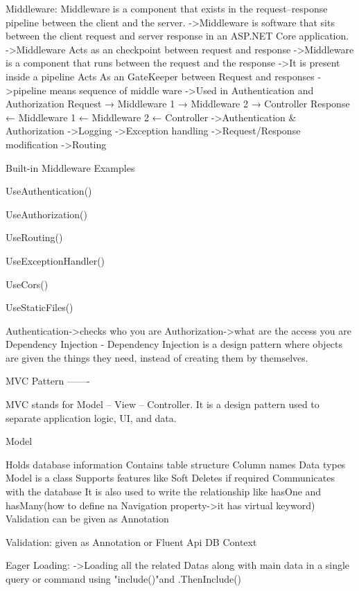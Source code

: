 Middleware:
        Middleware is a component that exists in the request–response pipeline between the client and the server.
          ->Middleware is software that sits between the client request and server response in an ASP.NET Core application.
          ->Middleware Acts as an checkpoint between request and response
            ->Middleware is a component that runs between the request and the response
            ->It is present inside a pipeline Acts As an GateKeeper between Request and responses
            ->pipeline means sequence of middle ware
            ->Used in Authentication and Authorization
            Request  →  Middleware 1 → Middleware 2 → Controller
            Response ←  Middleware 1 ← Middleware 2 ← Controller
            ->Authentication & Authorization
            ->Logging
            ->Exception handling
            ->Request/Response modification
            ->Routing

            Built-in Middleware Examples

UseAuthentication()

UseAuthorization()

UseRouting()

UseExceptionHandler()

UseCors()

UseStaticFiles()


Authentication->checks who you are
Authorization->what are the access you are
Dependency Injection - Dependency Injection is a design pattern where objects are given the things they need, instead of creating them by themselves.



MVC Pattern
-------

MVC stands for Model – View – Controller.
It is a design pattern used to separate application logic, UI, and data.

Model

        Holds database information
        Contains table structure
        Column names
        Data types
        Model is a class
        Supports features like Soft Deletes if required
        Communicates with the database
        It is also used to write the relationship like hasOne and hasMany(how to define na Navigation property->it has virtual keyword)
        Validation can be given as Annotation

Validation:
            given as Annotation
            or Fluent Api DB Context

Eager Loading:
            ->Loading all the related Datas along with main data in a single query or command using "include()"and .ThenInclude()

